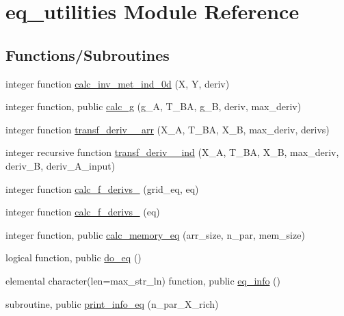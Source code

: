 \hypertarget{namespaceeq__utilities}{}\section{eq\+\_\+utilities Module Reference}
\label{namespaceeq__utilities}
\subsection*{Functions/\+Subroutines}
\begin{DoxyCompactItemize}
\item 
integer function \hyperlink{namespaceeq__utilities_a2994002cd224e90f6bd71c926b09fee2}{calc\+\_\+inv\+\_\+met\+\_\+ind\+\_\+0d} (X, Y, deriv)
\item 
integer function, public \hyperlink{namespaceeq__utilities_a1426f7226577f8719472265fd882fbf4}{calc\+\_\+g} (g\+\_\+A, T\+\_\+\+BA, g\+\_\+B, deriv, max\+\_\+deriv)
\item 
integer function \hyperlink{namespaceeq__utilities_ad7bf3c0a3d42efa072a70e8dffba5451}{transf\+\_\+deriv\+\_\+\_\+arr} (X\+\_\+A, T\+\_\+\+BA, X\+\_\+B, max\+\_\+deriv, derivs)
\item 
integer recursive function \hyperlink{namespaceeq__utilities_af86031bb0a0aa17c93d160fe80931be7}{transf\+\_\+deriv\+\_\+\_\+ind} (X\+\_\+A, T\+\_\+\+BA, X\+\_\+B, max\+\_\+deriv, deriv\+\_\+B, deriv\+\_\+\+A\+\_\+input)
\item 
integer function \hyperlink{namespaceeq__utilities_aad960e0306e883b83c7a2c6146b48b48}{calc\+\_\+f\+\_\+derivs\+\_} (grid\+\_\+eq, eq)
\item 
integer function \hyperlink{namespaceeq__utilities_a9e8269c4f0a20b8b9622fbe8739ba1a8}{calc\+\_\+f\+\_\+derivs\+\_} (eq)
\item 
integer function, public \hyperlink{namespaceeq__utilities_a5a9f230ed9a6e627e31e882e9f4a00a1}{calc\+\_\+memory\+\_\+eq} (arr\+\_\+size, n\+\_\+par, mem\+\_\+size)
\item 
logical function, public \hyperlink{namespaceeq__utilities_a5109472305101af3a15e8e8717c426fd}{do\+\_\+eq} ()
\item 
elemental character(len=max\+\_\+str\+\_\+ln) function, public \hyperlink{namespaceeq__utilities_a34c5ddab45a54a6c738e5e0b8c7d55d6}{eq\+\_\+info} ()
\item 
subroutine, public \hyperlink{namespaceeq__utilities_a40f397d20b45432117744ca16870ddbb}{print\+\_\+info\+\_\+eq} (n\+\_\+par\+\_\+\+X\+\_\+rich)
\end{DoxyCompactItemize}
